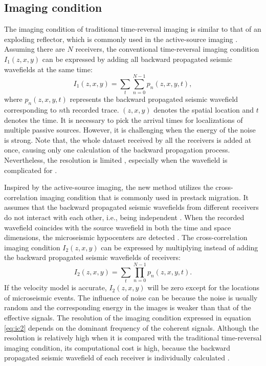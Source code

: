 \subsection{Imaging condition}
The imaging condition of traditional time-reversal imaging is similar to that of an exploding reflector, which is commonly used in the active-source imaging  \cite[]{2005Reverse}. 
Assuming there are $N$ receivers, the conventional time-reversal imaging condition $I_1(z,x,y)$ can be expressed by adding all backward propagated seismic wavefields at the same time: 
\begin{equation}\label{eq:ic1}
I_1(z,x,y)=\sum_{t}\sum_{n=0}^{N-1} p_{n}(z,x,y,t),
\end{equation}
where $p_n(z,x,y,t)$ represents the backward propagated seismic wavefield corresponding to $n$th recorded trace. $(z, x, y)$ denotes the spatial location and $t$ denotes the time. It is necessary to pick the arrival times for localizations of multiple passive sources. However, it is challenging when the energy of the noise is strong. Note that, the whole dataset received by all the receivers is added at once, causing only one calculation of the backward propagation process. Nevertheless, the resolution is limited , especially when the wavefield is complicated for .  

Inspired by the active-source imaging, the new method utilizes the cross-correlation imaging condition that is commonly used in prestack migration. It assumes that the backward propagated seismic wavefields from different receivers do not interact with each other, i.e., being independent \cite[]{Junzhe2015}.  When the recorded wavefield coincides with the source wavefield in both the time and space dimensions, the microseismic hypocenters are detected \cite[]{Nori2015}.
The  cross-correlation imaging condition $I_2(z,x,y)$ can be expressed by multiplying instead of adding the backward propagated seismic wavefields of receivers: 
\begin{equation}\label{eq:ic2}
I_2(z,x,y)=\sum_{t}\prod_{n=0}^{N-1} p_{n}(z,x,y,t).
\end{equation}
If the velocity model is accurate, $I_2(z,x,y)$ will be zero except for the locations of microseismic events. The influence of noise can be  because the noise is usually random and the corresponding energy in the images is weaker than that of the effective signals. The resolution of the imaging condition expressed in equation \ref{eq:ic2} depends on the dominant frequency of the coherent signals. Although the resolution is relatively high when it is compared with the traditional time-reversal imaging condition, its computational cost is high, because the backward propagated seismic wavefield of each receiver is individually calculated \cite[]{Junzhe2015}. 

